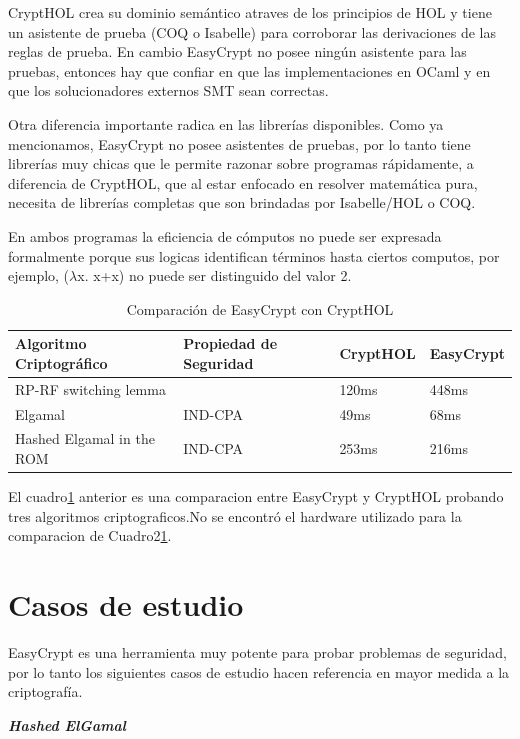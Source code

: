 \documentclass[runningheads,a4paper]{llncs}
\begin{document}
CryptHOL crea su dominio semántico atraves de los principios de HOL y tiene un asistente de prueba (COQ o Isabelle) para corroborar las derivaciones de las reglas de prueba. En cambio EasyCrypt no posee ningún asistente para las pruebas, entonces hay que confiar en que las implementaciones en OCaml y en que los solucionadores externos SMT sean correctas.

Otra diferencia importante radica en las librerías disponibles. Como ya mencionamos, EasyCrypt no posee asistentes de pruebas, por lo tanto tiene librerías muy chicas que le permite razonar sobre programas rápidamente, a diferencia de CryptHOL, que al estar enfocado en resolver matemática pura, necesita de librerías completas que son brindadas por Isabelle/HOL o COQ.

En ambos programas la eficiencia de cómputos no puede ser expresada formalmente porque sus logicas identifican términos hasta ciertos computos, por ejemplo, ($\lambda$x. x+x) no puede ser distinguido del valor 2.\cite{article6}

\begin{table}
  \caption{Comparación de EasyCrypt con CryptHOL}
  \label{tab:simple2}
  \centering
  \begin{tabular}{ |p{4cm}|p{3.5cm}|p{2cm}|p{2cm}|  }
 \hline
 Algoritmo Criptográfico & Propiedad de Seguridad & CryptHOL & EasyCrypt\\\cline{1-4}
 \hline
 RP-RF switching lemma &  & 120ms & 448ms\\
 Elgamal & IND-CPA & 49ms  & 68ms\\
 Hashed Elgamal in the ROM & IND-CPA & 253ms &  216ms\\
 \hline
\end{tabular}
\end{table}


El cuadro\ref{tab:simple2} anterior es una comparacion entre EasyCrypt y CryptHOL probando tres algoritmos criptograficos.No se encontró el hardware utilizado para la comparacion de Cuadro2\ref{tab:simple2}.




\section{Casos de estudio}
EasyCrypt es una herramienta muy potente para probar problemas de seguridad, por lo tanto los siguientes casos de estudio hacen referencia en mayor medida a la criptografía.


\centerline{\textbf{{\emph{Hashed ElGamal}}}}
\end{document}

